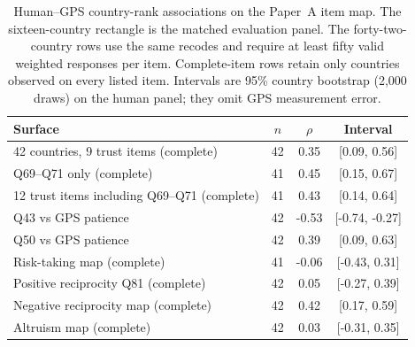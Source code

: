 \begin{table}[htbp]\centering\small
\caption{Human--GPS country-rank associations on the Paper~A item map. The sixteen-country rectangle is the matched evaluation panel. The forty-two-country rows use the same recodes and require at least fifty valid weighted responses per item. Complete-item rows retain only countries observed on every listed item. Intervals are 95\% country bootstrap (2,000 draws) on the human panel; they omit GPS measurement error.}
\label{tab:human42}
\begin{tabular}{lccc}\toprule
Surface & $n$ & $\rho$ & Interval\\\midrule
42 countries, 9 trust items (complete) & 42 & 0.35 & [0.09, 0.56] \\
Q69--Q71 only (complete) & 41 & 0.45 & [0.15, 0.67] \\
12 trust items including Q69--Q71 (complete) & 41 & 0.43 & [0.14, 0.64] \\
Q43 vs GPS patience & 42 & -0.53 & [-0.74, -0.27] \\
Q50 vs GPS patience & 42 & 0.39 & [0.09, 0.63] \\
Risk-taking map (complete) & 41 & -0.06 & [-0.43, 0.31] \\
Positive reciprocity Q81 (complete) & 42 & 0.05 & [-0.27, 0.39] \\
Negative reciprocity map (complete) & 42 & 0.42 & [0.17, 0.59] \\
Altruism map (complete) & 42 & 0.03 & [-0.31, 0.35] \\
\bottomrule
\end{tabular}
\end{table}

